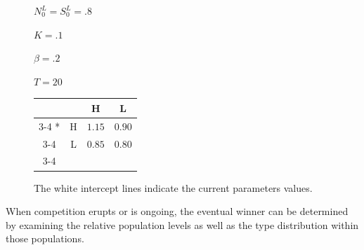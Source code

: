 \begin{figure}[p]
\begin{minipage}[c]{.2\textwidth}
    $N_0^L = S_0^L = .8$
    
    $K = .1$
    
    $\beta = .2$
    
    $T = 20$
    \end{minipage}\hfill
  \begin{minipage}[c]{.3\textwidth}
  \begin{tabular}{cc|c|c|}
      & \multicolumn{1}{c}{} & \multicolumn{1}{c}{H}  & \multicolumn{1}{c}{L} \\\cline{3-4}
      \multirow{2}*{}  & H & $1.15$ & $0.90$ \\\cline{3-4}
      & L & $0.85$ & $0.80$ \\\cline{3-4}
    \end{tabular}
    \end{minipage}\hfill
    \begin{minipage}[c]{.3\textwidth}
    The white intercept lines indicate the current parameters values. 
    \end{minipage}
    \end{figure}



When competition erupts or is ongoing, the eventual winner can be determined by examining the relative population levels as well as the type distribution within those populations.

